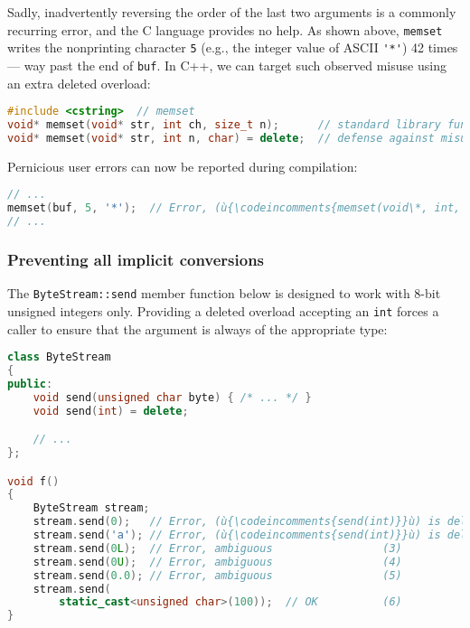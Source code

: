     
\noindent Sadly, inadvertently reversing the order of the last two arguments is a commonly
recurring error, and the C language provides no help. As shown above, \lstinline!memset! writes the nonprinting character \lstinline!5! (e.g., the integer value of ASCII \lstinline!'*'!) 42 times --- way past the end of \lstinline!buf!. In C++, we
can target such observed misuse using an extra deleted overload:

\begin{lstlisting}[language=C++]
#include <cstring>  // memset
void* memset(void* str, int ch, size_t n);      // standard library function
void* memset(void* str, int n, char) = delete;  // defense against misuse
\end{lstlisting}
    
\noindent Pernicious user errors can now be reported during compilation:

\begin{lstlisting}[language=C++]
// ...
memset(buf, 5, '*');  // Error, (ù{\codeincomments{memset(void\*, int, char)}}ù) is deleted.
// ...
\end{lstlisting}
    

\subsubsection[Preventing all implicit conversions]{Preventing all implicit conversions}\label{preventing-all-implicit-conversions}

The \lstinline!ByteStream::send! member function below is designed to work
with 8-bit unsigned integers only. Providing a deleted overload
accepting an \lstinline!int! forces a caller to ensure that the argument is
always of the appropriate type:

\begin{lstlisting}[language=C++]
class ByteStream
{
public:
    void send(unsigned char byte) { /* ... */ }
    void send(int) = delete;

    // ...
};

void f()
{
    ByteStream stream;
    stream.send(0);   // Error, (ù{\codeincomments{send(int)}}ù) is deleted.     (1)
    stream.send('a'); // Error, (ù{\codeincomments{send(int)}}ù) is deleted.     (2)
    stream.send(0L);  // Error, ambiguous                 (3)
    stream.send(0U);  // Error, ambiguous                 (4)
    stream.send(0.0); // Error, ambiguous                 (5)
    stream.send(
        static_cast<unsigned char>(100));  // OK          (6)
}
\end{lstlisting}
    
